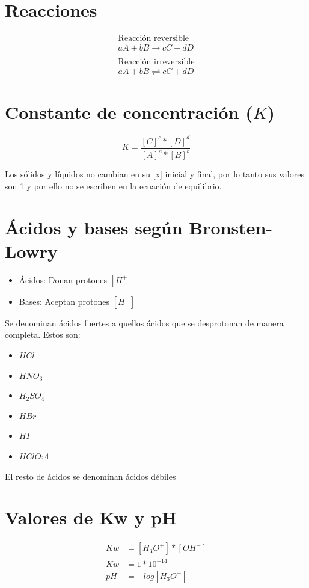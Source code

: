 \section{Reacciones}

\begin{align*}
    \text{Reacción reversible}
    \\
    aA + bB \rightarrow cC + dD
    \\
    \\
    \text{Reacción irreversible}
    \\
    aA + bB ⇌ cC + dD
\end{align*}

\section{Constante de concentración ($K$)}

\begin{equation*}
    K=\frac {[C]^c*[D]^d}{[A]^a*[B]^b}
\end{equation*}

Los sólidos y líquidos no cambian en su [x] inicial y final, por lo tanto sus valores son 1 y por ello no se escriben en la ecuación de equilibrio.

\section{Ácidos y bases según Bronsten-Lowry}

\begin{itemize}
    \item Ácidos: Donan protones $[H^{+}]$
    \item Bases: Aceptan protones $[H^{+}]$ 
\end{itemize}

Se denominan ácidos fuertes a quellos ácidos que se desprotonan de manera completa. Estos son: 

\begin{itemize}
    \item $HCl$
    \item $HNO_{3}$
    \item $H_{2}SO_{4}$
    \item $HBr$
    \item $HI$
    \item $HClO:{4}$
\end{itemize}

El resto de ácidos se denominan ácidos débiles

\section{Valores de Kw y pH}

\begin{align*}
    Kw &= [H_{3}O^{+}]*[OH^{-}]
    \\
    Kw &= 1*10^{-14}
    \\
    pH &= -log[H_{3}O^{+}]
\end{align*}
